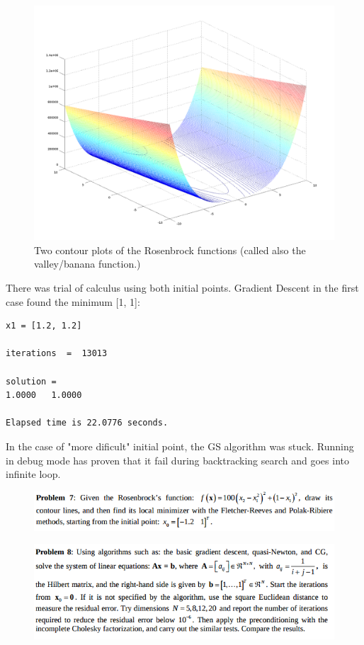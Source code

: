 \documentclass[eng,openany]{mgr}
\begin{document}
\begin{figure}[h]
\centering
\includegraphics[width=0.5\linewidth]{screenshot018}
\caption{Two contour plots of the Rosenbrock functions (called also the valley/banana function.)}
\label{fig:screenshot018}
\end{figure}
There was trial of calculus using both initial points. Gradient Descent in the first case found the minimum [1, 1]:
\begin{lstlisting}
x1 = [1.2, 1.2]

iterations  =  13013

solution =
1.0000   1.0000

Elapsed time is 22.0776 seconds.
\end{lstlisting} 
In the case of "more dificult" initial point, the GS algorithm was stuck. Running in debug mode has proven that it fail during backtracking search and goes into infinite loop.
























\clearpage
\begin{figure}[h]
\centering
\includegraphics[width=0.7\linewidth]{screenshot016}
\label{fig:screenshot016}
\end{figure}










\clearpage
\begin{figure}[h]
\centering
\includegraphics[width=0.7\linewidth]{screenshot017}
\label{fig:screenshot017}
\end{figure}
\end{document}

